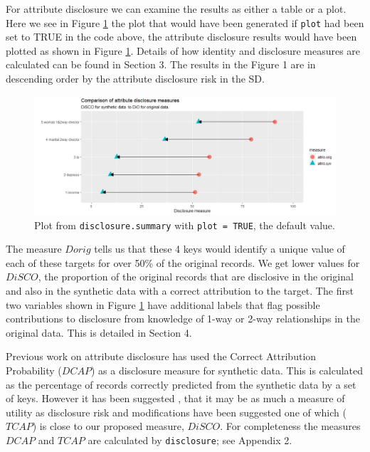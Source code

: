 \documentclass[12pt]{article}
\begin{document}
For attribute disclosure we can examine the results as either a table or a plot. Here we see in Figure \ref{fig:f1} the plot that would have been generated if \texttt{plot} had been set to TRUE in the code above, the attribute disclosure results would have been plotted as shown in Figure \ref{fig:f1}. Details of how identity and disclosure measures are calculated can be found in Section 3. The results in the Figure 1 are in descending order by the attribute disclosure risk in the SD.

\begin{figure}[ht]
  \centering
  \includegraphics[width=1\linewidth]{fig1dis.png}
  \caption{Plot from \texttt{disclosure.summary} with \texttt{plot = TRUE}, the default value.}
  \label{fig:f1}
\end{figure}


The measure $Dorig$ tells us that these 4 keys would identify a unique value of each of these targets for over 50\% of the original records. We get lower values for $DiSCO$, the proportion of the original records that are disclosive in the original and also in the synthetic data with a correct attribution to the target. The first two variables shown in Figure \ref{fig:f1} have additional labels that 
flag possible contributions to disclosure from knowledge of 1-way or 2-way relationships in the original data. This is detailed in Section 4. 

Previous work on attribute disclosure \cite{elliot2014SYLLS,taub_PSD2018} has used the Correct Attribution Probability ($DCAP$) as a disclosure measure for synthetic data. This is calculated as the percentage of records correctly predicted from the synthetic data by a set of keys.  However it has been suggested \cite{ChenUNECE2019}, that it may be as much a measure of utility as disclosure risk and modifications have been suggested \cite{taubUNECE2019,little2022} one of which ($TCAP$) is close to our proposed measure, $DiSCO$. For completeness the measures $DCAP$ and $TCAP$ are calculated by \texttt{disclosure}; see Appendix 2.
\end{document}
